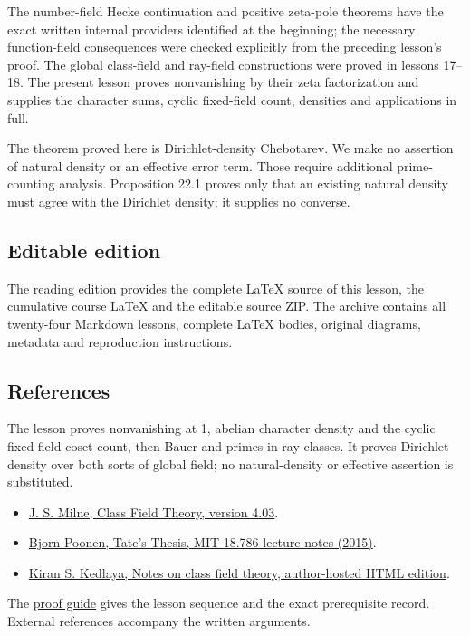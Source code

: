 \documentclass[11pt,a4paper]{article}
\newcommand{\tightlist}{\setlength{\itemsep}{0pt}\setlength{\parskip}{0pt}}
\begin{document}
The number-field Hecke continuation and positive zeta-pole theorems have
the exact written internal providers identified at the beginning; the
necessary function-field consequences were checked explicitly from the
preceding lesson's proof. The global class-field and ray-field
constructions were proved in lessons 17--18. The present lesson proves
nonvanishing by their zeta factorization and supplies the character
sums, cyclic fixed-field count, densities and applications in full.

The theorem proved here is Dirichlet-density Chebotarev. We make no
assertion of natural density or an effective error term. Those require
additional prime-counting analysis. Proposition 22.1 proves only that an
existing natural density must agree with the Dirichlet density; it
supplies no converse.

\subsection{Editable edition}\label{editable-edition}

The reading edition provides the complete LaTeX source of this lesson,
the cumulative course LaTeX and the editable source ZIP. The archive
contains all twenty-four Markdown lessons, complete LaTeX bodies,
original diagrams, metadata and reproduction instructions.

\subsection{References}\label{references}

The lesson proves nonvanishing at 1, abelian character density and the
cyclic fixed-field coset count, then Bauer and primes in ray classes. It
proves Dirichlet density over both sorts of global field; no
natural-density or effective assertion is substituted.

\begin{itemize}
\tightlist
\item
  \href{https://www.jmilne.org/math/CourseNotes/CFT.pdf}{J. S. Milne,
  Class Field Theory, version 4.03}.
\item
  \href{https://math.mit.edu/~poonen/786/notes.pdf}{Bjorn Poonen, Tate's
  Thesis, MIT 18.786 lecture notes (2015)}.
\item
  \href{https://kskedlaya.org/cft/sec_abstractcft1.html}{Kiran S.
  Kedlaya, Notes on class field theory, author-hosted HTML edition}.
\end{itemize}

The \href{../free-proofs.html}{proof guide} gives the lesson sequence
and the exact prerequisite record. External references accompany the
written arguments.
\end{document}
